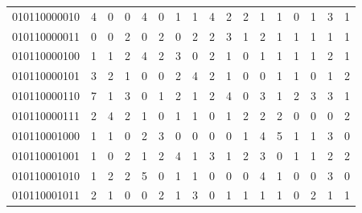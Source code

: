 \documentclass[10pt,a4paper]{article}
\begin{document}
\begin{longtable}{ |c|c|c|c|c|c|c|c|c|c|c|c|c|c|c|c|c| }
    010110000010              & 4                            & 0                                & 0                            & 4                              & 0   & 1   & 1   & 4   & 2   & 2   & 1   & 1   & 0   & 1   & 3   & 1   \\
    010110000011              & 0                            & 0                                & 2                            & 0                              & 2   & 0   & 2   & 2   & 3   & 1   & 2   & 1   & 1   & 1   & 1   & 1   \\
    010110000100              & 1                            & 1                                & 2                            & 4                              & 2   & 3   & 0   & 2   & 1   & 0   & 1   & 1   & 1   & 1   & 2   & 1   \\
    010110000101              & 3                            & 2                                & 1                            & 0                              & 0   & 2   & 4   & 2   & 1   & 0   & 0   & 1   & 1   & 0   & 1   & 2   \\
    010110000110              & 7                            & 1                                & 3                            & 0                              & 1   & 2   & 1   & 2   & 4   & 0   & 3   & 1   & 2   & 3   & 3   & 1   \\
    010110000111              & 2                            & 4                                & 2                            & 1                              & 0   & 1   & 1   & 0   & 1   & 2   & 2   & 2   & 0   & 0   & 0   & 2   \\
    010110001000              & 1                            & 1                                & 0                            & 2                              & 3   & 0   & 0   & 0   & 0   & 1   & 4   & 5   & 1   & 1   & 3   & 0   \\
    010110001001              & 1                            & 0                                & 2                            & 1                              & 2   & 4   & 1   & 3   & 1   & 2   & 3   & 0   & 1   & 1   & 2   & 2   \\
    010110001010              & 1                            & 2                                & 2                            & 5                              & 0   & 1   & 1   & 0   & 0   & 0   & 4   & 1   & 0   & 0   & 3   & 0   \\
    010110001011              & 2                            & 1                                & 0                            & 0                              & 2   & 1   & 3   & 0   & 1   & 1   & 1   & 1   & 0   & 2   & 1   & 1   \\

\end{longtable}
\end{document}
